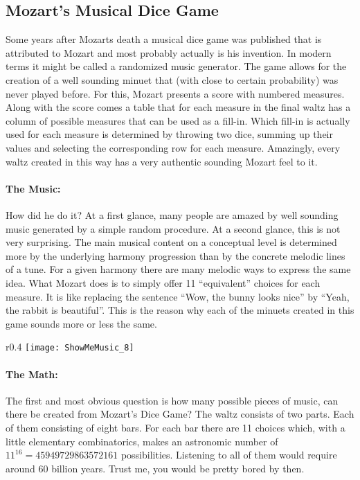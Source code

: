 \subsection{Mozart's Musical Dice Game}
Some years after Mozarts death a musical dice game was published that is attributed to Mozart and most probably actually is his invention. In modern terms it might be called a randomized music generator. The game allows for the creation of a well sounding minuet that (with close to certain probability) was never played before. For this, Mozart presents a score with numbered measures. Along with the score comes a table that for each measure in the final waltz has a column of possible measures that can be used as a fill-in. Which fill-in is actually used for each measure is determined by throwing two dice, summing up their values and selecting the corresponding row for each measure. Amazingly, every waltz created in this way has a very authentic sounding Mozart feel to it.

\paragraph{The Music:} How did he do it? At a first glance, many people are amazed by well sounding music generated by a simple random procedure. At a second glance, this is not very surprising. The main musical content on a conceptual level is determined more by the underlying harmony progression than by the concrete melodic lines of a tune. For a given harmony there are many melodic ways to express the same idea. What Mozart does is to simply offer 11 ``equivalent'' choices for each measure. It is like replacing the sentence ``Wow, the bunny looks nice'' by ``Yeah, the rabbit is beautiful''. This is the reason why each of the minuets created in this game sounds more or less the same.

\begin{wrapfigure}[22]{r}{0.4\textwidth}
\centering
\texttt{[image: ShowMeMusic\_8]}
\end{wrapfigure}

\paragraph{The Math:} The first and most obvious question is how many possible pieces of music, can there be created from Mozart's Dice Game? The waltz consists of two parts. Each of them consisting of eight bars. For each bar there are 11 choices which, with a little elementary combinatorics, makes an astronomic number of $11^{16} = 45 949 729 863 572 161$ possibilities. Listening to all of them would require around 60 billion years. Trust me, you would be pretty bored by then.

